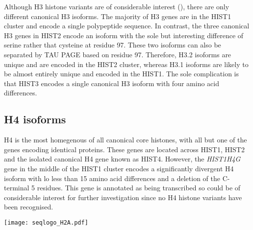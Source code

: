 	Although H3 histone variants are of considerable interest (), 
	there are only \HThreeUniqueProteins{} different canonical H3 isoforms. 
	The majority of H3 genes are in the HIST1 cluster 
	and encode a single polypeptide sequence. 
	In contrast, the three canonical H3 genes in HIST2 encode an isoform 
	with the sole but interesting difference of serine rather that cysteine at residue 97.
	These two isoforms can also be separated by TAU PAGE based on residue 97. 
	Therefore, H3.2 isoforms are unique and are encoded in the HIST2 cluster, 
	whereas H3.1 isoforms are likely to be almost entirely unique and encoded in the HIST1. 
	The sole complication is that HIST3 encodes a single canonical H3 isoform 
	with four amino acid differences.
	
  \subsection{H4 isoforms}
	H4 is the most homegenous of all canonical core histones, 
	with all but one of the \HFourCodingGenes{} genes encoding identical proteins. 
	These genes are located across HIST1, HIST2 
	and the isolated canonical H4 gene known as HIST4.
	However, the \textit{HIST1H4G} gene in the middle of the HIST1 cluster 
	encodes a significantly divergent H4 isoform 
	with lo less than 15 amino acid differences and a deletion of the C-terminal 5 residues. 
	This gene is annotated as being transcribed 
	so could be of considerable interest for further investigation 
	since no H4 histone variants have been recognised.


  \begin{TableAndFigure*}
    \label{tab:H2A-consensus}
    

    \texttt{[image: seqlogo\_H2A.pdf]}
    \label{fig:H2A-weblogo}
  \end{TableAndFigure*}

